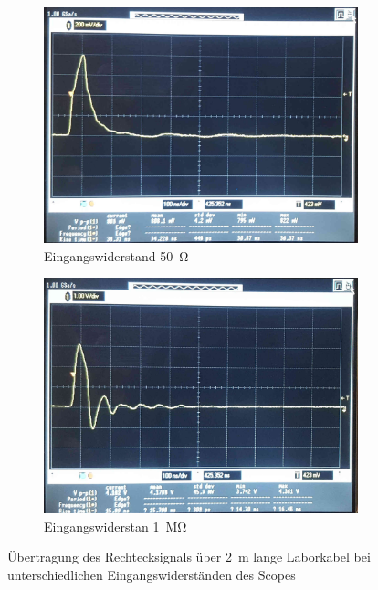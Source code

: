 \documentclass[a4paper,twoside,final]{article}
\begin{document}
\begin{figure}[htp]
    \centering
    \begin{subfigure}{0.45\textwidth}
        \includegraphics[width=\textwidth]{Bilder/Bild9.jpg}
        \caption{Eingangswiderstand \SI{50}{\ohm}}
    \end{subfigure}\hspace{1cm}
    \begin{subfigure}{0.45\textwidth}
        \includegraphics[width=\textwidth]{Bilder/Bild10.jpg}
        \caption{Eingangswiderstan \SI{1}{\mega\ohm}}
    \end{subfigure}
    \caption{Übertragung des Rechtecksignals über \SI{2}{\metre} lange Laborkabel bei unterschiedlichen Eingangswiderständen des Scopes}
\end{figure}
\end{document}
